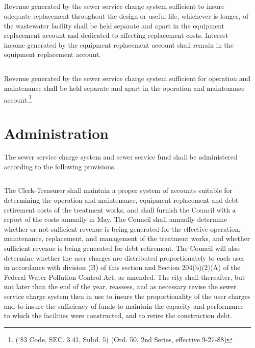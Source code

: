 \subsection{}
Revenue generated by the sewer service charge system sufficient to insure adequate replacement throughout the design or useful life, whichever is longer, of the wastewater facility shall be held separate and apart in the equipment replacement account and dedicated to affecting replacement costs.  Interest income generated by the equipment replacement account shall remain in the equipment replacement account.
\subsection{}
Revenue generated by the sewer service charge system sufficient for operation and maintenance shall be held separate and apart in the operation and maintenance account.\footnote{(‘83 Code, SEC. 3.41, Subd. 5) (Ord. 50, 2nd Series, effective 9-27-88)}

\section{Administration}
The sewer service charge system and sewer service fund shall be administered according to the following provisions.
\subsection{}
The Clerk-Treasurer shall maintain a proper system of accounts suitable for determining the operation and maintenance, equipment replacement and debt retirement costs of the treatment works, and shall furnish the Council with a report of the costs annually in May.  The Council shall annually determine whether or not sufficient revenue is being generated for the effective operation, maintenance, replacement, and management of the treatment works, and whether sufficient revenue is being generated for debt retirement. The Council will also determine whether the user charges are distributed proportionately to each user in accordance with division (B) of this section and Section 204(b)(2)(A) of the Federal Water Pollution Control Act, as amended. The city shall thereafter, but not later than the end of the year, reassess, and as necessary revise the sewer service charge system then in use to insure the proportionality of the user charges and to insure the sufficiency of funds to maintain the capacity and performance to which the facilities were constructed, and to retire the construction debt.
